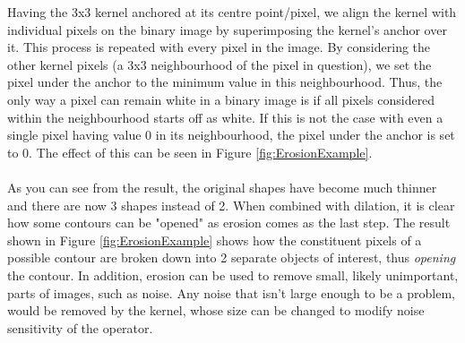 \documentclass[11pt]{article}
\begin{document}
Having the 3x3 kernel anchored at its centre point/pixel, we align
the kernel with individual pixels on the binary image by superimposing
the kernel's anchor over it. This process is repeated with every pixel in
the image. By considering the other kernel pixels (a 3x3 neighbourhood
of the pixel in question), we set the pixel under the anchor to the minimum 
value in this neighbourhood. Thus, the only way a pixel can remain white in
a binary image is if all pixels considered within the neighbourhood
starts off as white. If this is not the case with even a single pixel having
value 0 in its neighbourhood, the pixel under the anchor is set to 0. The effect
of this can be seen in Figure \ref{fig:ErosionExample}.\\
\\
As you can see from 
the result, the original shapes have become much thinner and there are now
3 shapes instead of 2. When combined with dilation, it is clear how some contours
can be "opened" as erosion comes as the last step. The result shown in
Figure \ref{fig:ErosionExample} shows how the constituent pixels
of a possible contour are broken down into 2 separate objects of interest, thus 
\textit{opening} the contour. In addition, erosion can be used to remove
small, likely unimportant, parts of images, such as noise. Any noise
that isn't large enough to be a problem, would be removed by the kernel, 
whose size can be changed to modify noise sensitivity of the operator.\\
\end{document}
